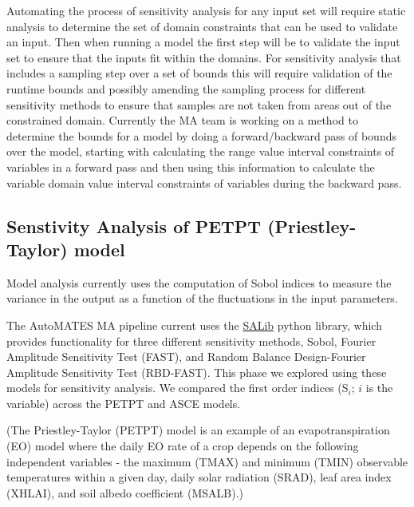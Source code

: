 \documentclass[article, 12pt, oneside]{memoir}
\begin{document}
Automating the process of sensitivity analysis for any input set will
require static analysis to determine the set of domain constraints that
can be used to validate an input. Then when running a model the first
step will be to validate the input set to ensure that the inputs fit
within the domains. For sensitivity analysis that includes a sampling
step over a set of bounds this will require validation of the runtime
bounds and possibly amending the sampling process for different
sensitivity methods to ensure that samples are not taken from areas out
of the constrained domain. Currently the MA team is working on a method
to determine the bounds for a model by doing a forward/backward pass of
bounds over the model, starting with calculating the range value
interval constraints of variables in a forward pass and then using this
information to calculate the variable domain value interval constraints
of variables during the backward pass.

\hypertarget{senstivity-analysis-of-petpt-priestley-taylor-model}{%
\subsection{Senstivity Analysis of PETPT (Priestley-Taylor)
model}\label{senstivity-analysis-of-petpt-priestley-taylor-model}}

Model analysis currently uses the computation of Sobol indices to
measure the variance in the output as a function of the fluctuations in
the input parameters.

The AutoMATES MA pipeline current uses the
\href{https://salib.readthedocs.io/en/latest/}{SALib} python library,
which provides functionality for three different sensitivity methods,
Sobol, Fourier Amplitude Sensitivity Test (FAST), and Random Balance
Design-Fourier Amplitude Sensitivity Test (RBD-FAST). This phase we
explored using these models for sensitivity analysis. We compared the
first order indices (S\(_i\); \(i\) is the variable) across the PETPT
and ASCE models.

(The Priestley-Taylor (PETPT) model is an example of an
evapotranspiration (EO) model where the daily EO rate of a crop depends
on the following independent variables - the maximum (TMAX) and minimum
(TMIN) observable temperatures within a given day, daily solar radiation
(SRAD), leaf area index (XHLAI), and soil albedo coefficient (MSALB).)
\end{document}
